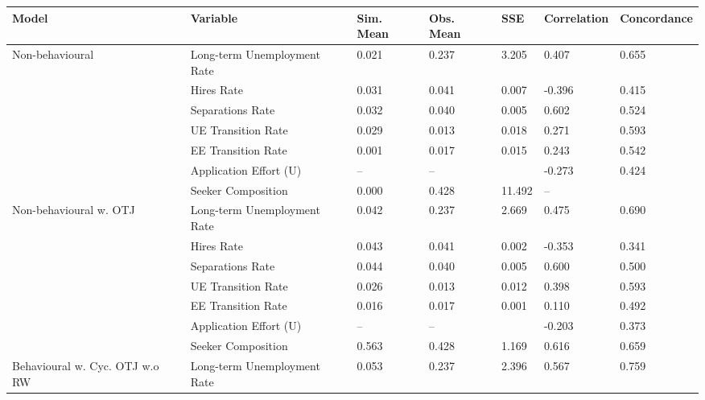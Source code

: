 \begin{adjustbox}{width=\textwidth}
\begin{tabular}{lllllll}
\toprule
Model & Variable & Sim. Mean & Obs. Mean & SSE & Correlation & Concordance \\
\midrule
\cellcolor{modelNonbehavioural!25}Non-behavioural & Long-term Unemployment Rate & 0.021 & 0.237 & 3.205 & \cellcolor{red!25}0.407 & 0.655 \\
\cellcolor{modelNonbehavioural!25} & Hires Rate & 0.031 & 0.041 & 0.007 & \cellcolor{orange!25}-0.396 & 0.415 \\
\cellcolor{modelNonbehavioural!25} & Separations Rate & 0.032 & 0.040 & 0.005 & \cellcolor{orange!25}0.602 & 0.524 \\
\cellcolor{modelNonbehavioural!25} & UE Transition Rate & 0.029 & 0.013 & 0.018 & \cellcolor{red!25}0.271 & 0.593 \\
\cellcolor{modelNonbehavioural!25} & EE Transition Rate & 0.001 & 0.017 & 0.015 & \cellcolor{green!25}0.243 & 0.542 \\
\cellcolor{modelNonbehavioural!25} & Application Effort (U) & -- & -- &  & \cellcolor{yellow!25}-0.273 & 0.424 \\
\cellcolor{modelNonbehavioural!25} & Seeker Composition & 0.000 & 0.428 & 11.492 & -- &  \\
\cellcolor{modelNonbehaviouralwOTJ!25}Non-behavioural w. OTJ & Long-term Unemployment Rate & 0.042 & 0.237 & 2.669 & \cellcolor{orange!25}0.475 & 0.690 \\
\cellcolor{modelNonbehaviouralwOTJ!25} & Hires Rate & 0.043 & 0.041 & 0.002 & \cellcolor{yellow!25}-0.353 & 0.341 \\
\cellcolor{modelNonbehaviouralwOTJ!25} & Separations Rate & 0.044 & 0.040 & 0.005 & \cellcolor{red!25}0.600 & 0.500 \\
\cellcolor{modelNonbehaviouralwOTJ!25} & UE Transition Rate & 0.026 & 0.013 & 0.012 & \cellcolor{yellow!25}0.398 & 0.593 \\
\cellcolor{modelNonbehaviouralwOTJ!25} & EE Transition Rate & 0.016 & 0.017 & 0.001 & \cellcolor{yellow!25}0.110 & 0.492 \\
\cellcolor{modelNonbehaviouralwOTJ!25} & Application Effort (U) & -- & -- &  & \cellcolor{green!40!yellow!25}-0.203 & 0.373 \\
\cellcolor{modelNonbehaviouralwOTJ!25} & Seeker Composition & 0.563 & 0.428 & 1.169 & \cellcolor{green!70!yellow!25}0.616 & 0.659 \\
\cellcolor{modelBehaviouralwCycOTJwoRW!25}Behavioural w. Cyc. OTJ w.o RW & Long-term Unemployment Rate & 0.053 & 0.237 & 2.396 & \cellcolor{yellow!25}0.567 & 0.759 \\

\end{tabular}
\end{adjustbox}
